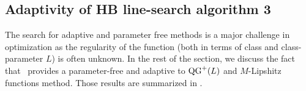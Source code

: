 




\subsection{\texorpdfstring{Adaptivity of HB line-search algorithm 3}{Adaptivity of HB line-search algorithm \ref{alg:ogm_ls}}}
The search for adaptive and parameter free methods is a major challenge in optimization as the regularity of the function (both in terms of class and class-parameter $L$) is often unknown. In the rest of the section, we discuss the fact that~ provides a parameter-free and adaptive to $\operatorname{QG}^+(L)$ and $M$-Lipshitz functions method. Those results are summarized in .

